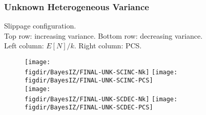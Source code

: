 {\begin{frame}
  \frametitle{Unknown Heterogeneous Variance}
  Slippage configuration.\\
  Top row: increasing variance.  Bottom row: decreasing variance.\\
  Left column: $E[N]/k$.  Right column: PCS.\\
  \begin{figure}
    \center
    \texttt{[image: \\figdir/BayesIZ/FINAL-UNK-SCINC-Nk]} \texttt{[image: \\figdir/BayesIZ/FINAL-UNK-SCINC-PCS]}\\
    \texttt{[image: \\figdir/BayesIZ/FINAL-UNK-SCDEC-Nk]} \texttt{[image: \\figdir/BayesIZ/FINAL-UNK-SCDEC-PCS]}\\
  \end{figure}

\end{frame}

}
